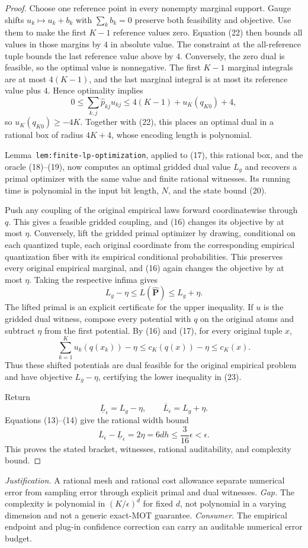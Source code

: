 \documentclass{article}
\begin{document}
\begin{proof}
Choose one reference point in every nonempty marginal support. Gauge shifts \(u_k\mapsto u_k+b_k\) with \(\sum_kb_k=0\) preserve both feasibility and objective. Use them to make the first \(K-1\) reference values zero. Equation (22) then bounds all values in those margins by \(4\) in absolute value. The constraint at the all-reference tuple bounds the last reference value above by \(4\). Conversely, the zero dual is feasible, so the optimal value is nonnegative. The first \(K-1\) marginal integrals are at most \(4(K-1)\), and the last marginal integral is at most its reference value plus \(4\). Hence optimality implies
\[
0\le\sum_{k,j}\widehat p_{kj}u_{kj}
\le4(K-1)+u_K(q_{K0})+4,
\]
so \(u_K(q_{K0})\ge-4K\). Together with (22), this places an optimal dual in a rational box of radius \(4K+4\), whose encoding length is polynomial.

Lemma~\texttt{lem:finite-lp-optimization}, applied to (17), this rational box, and the oracle (18)--(19), now computes an optimal gridded dual value \(L_g\) and recovers a primal optimizer with the same value and finite rational witnesses. Its running time is polynomial in the input bit length, \(N\), and the state bound (20).

Push any coupling of the original empirical laws forward coordinatewise through \(q\). This gives a feasible gridded coupling, and (16) changes its objective by at most \(\eta\). Conversely, lift the gridded primal optimizer by drawing, conditional on each quantized tuple, each original coordinate from the corresponding empirical quantization fiber with its empirical conditional probabilities. This preserves every original empirical marginal, and (16) again changes the objective by at most \(\eta\). Taking the respective infima gives
\[
L_g-\eta\le L(\widehat{\mathbf P})\le L_g+\eta.
\tag{23}
\]
The lifted primal is an explicit certificate for the upper inequality. If \(u\) is the gridded dual witness, compose every potential with \(q\) on the original atoms and subtract \(\eta\) from the first potential. By (16) and (17), for every original tuple \(x\),
\[
\sum_{k=1}^Ku_k(q(x_k))-\eta
\le c_K(q(x))-\eta
\le c_K(x).
\]
Thus these shifted potentials are dual feasible for the original empirical problem and have objective \(L_g-\eta\), certifying the lower inequality in (23).

Return
\[
\underline L_\epsilon=L_g-\eta,
\qquad
\overline L_\epsilon=L_g+\eta.
\]
Equations (13)--(14) give the rational width bound
\[
\overline L_\epsilon-\underline L_\epsilon
=2\eta=6dh\le\frac{3}{16}\epsilon<\epsilon.
\]
This proves the stated bracket, witnesses, rational auditability, and complexity bound.
\end{proof}
\par\smallskip\noindent \textit{Justification.} A rational mesh and rational cost allowance separate numerical error from sampling error through explicit primal and dual witnesses. \textit{Gap.} The complexity is polynomial in \((K/\epsilon)^d\) for fixed \(d\), not polynomial in a varying dimension and not a generic exact-MOT guarantee. \textit{Consumer.} The empirical endpoint and plug-in confidence correction can carry an auditable numerical error budget.
\end{document}

